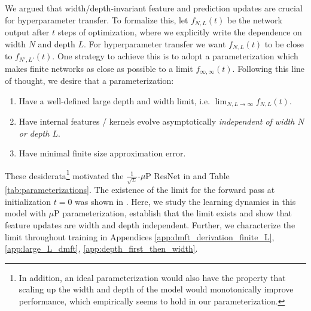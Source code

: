 \documentclass{article} %
\newcommand{\lorenzo}[1]{\fTBD{\textcolor{olive}{[Lorenzo] #1}}}
\newcommand{\bb}[1]{{\color{red}[BB: #1]}}
\begin{document}
We argued that width/depth-invariant feature and prediction updates are crucial for hyperparameter transfer. To formalize this, let $f_{N,L}(t)$ be the network output after $t$ steps of optimization, where we explicitly write the dependence on width $N$ and depth $L$. For hyperparameter transfer we want $f_{N,L}(t)$ to be close to $f_{N',L'}(t)$. One strategy to achieve this is to adopt a parameterization which makes finite networks as close as possible to a limit $f_{\infty, \infty}(t)$. Following this line of thought, we desire that a parameterization:
\begin{enumerate}
    \item Have a well-defined large depth and width limit, i.e. $\lim_{N,L \to \infty} f_{N,L}(t)$. %
    \item Have internal features / kernels evolve asymptotically \emph{independent of width $N$ or depth $L$}.  
    \item Have minimal finite size approximation error. 
\end{enumerate}
%
These desiderata\footnote{In addition, an ideal parameterization would also have the property that scaling up the width and depth of the model would monotonically improve performance, which empirically seems to hold in our parameterization.} motivated the $\frac{1}{\sqrt L}$-$\mu$P ResNet in  and Table \ref{tab:parameterizations}. The existence of the limit for the forward pass at initialization $t=0$ was shown in \cite{hayou2023width,cirone2023neural}. 
% 
Here, we study the learning dynamics in this model with $\mu$P parameterization, establish that the limit exists and show that feature updates are width and depth independent. 
% 
Further, we characterize the limit throughout training in Appendices \ref{app:dmft_derivation_finite_L}, \ref{app:large_L_dmft}, \ref{app:depth_first_then_width}.  
\end{document}
